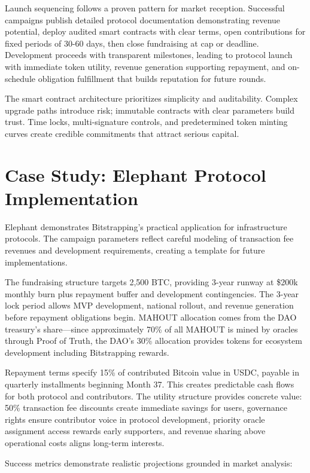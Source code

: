 Launch sequencing follows a proven pattern for market reception. Successful campaigns publish detailed protocol documentation demonstrating revenue potential, deploy audited smart contracts with clear terms, open contributions for fixed periods of 30-60 days, then close fundraising at cap or deadline. Development proceeds with transparent milestones, leading to protocol launch with immediate token utility, revenue generation supporting repayment, and on-schedule obligation fulfillment that builds reputation for future rounds.

The smart contract architecture prioritizes simplicity and auditability. Complex upgrade paths introduce risk; immutable contracts with clear parameters build trust. Time locks, multi-signature controls, and predetermined token minting curves create credible commitments that attract serious capital.

\section{Case Study: Elephant Protocol Implementation}

Elephant demonstrates Bitstrapping's practical application for infrastructure protocols. The campaign parameters reflect careful modeling of transaction fee revenues and development requirements, creating a template for future implementations.

The fundraising structure targets 2,500 BTC, providing 3-year runway at \$200k monthly burn plus repayment buffer and development contingencies. The 3-year lock period allows MVP development, national rollout, and revenue generation before repayment obligations begin. MAHOUT allocation comes from the DAO treasury's share—since approximately 70\% of all MAHOUT is mined by oracles through Proof of Truth, the DAO's 30\% allocation provides tokens for ecosystem development including Bitstrapping rewards.

Repayment terms specify 15\% of contributed Bitcoin value in USDC, payable in quarterly installments beginning Month 37. This creates predictable cash flows for both protocol and contributors. The utility structure provides concrete value: 50\% transaction fee discounts create immediate savings for users, governance rights ensure contributor voice in protocol development, priority oracle assignment access rewards early supporters, and revenue sharing above operational costs aligns long-term interests.

Success metrics demonstrate realistic projections grounded in market analysis:

